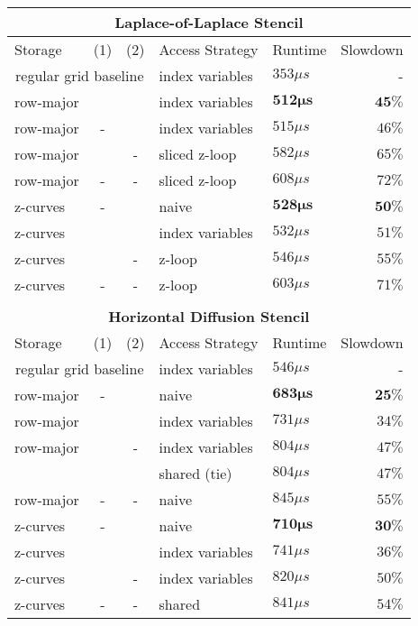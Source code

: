 \begin{table}
	\begin{tabular}{l c c l l r}		
		\multicolumn{6}{c}{\textbf{Laplace-of-Laplace Stencil}} \\
		\hline
		\hline
		Storage & (1) & (2) & Access Strategy  & Runtime & Slowdown \\
		\hline 
		\multicolumn{3}{c}{regular grid baseline} & index variables & $353 \mu s$ & -\\
		\hline
		 row-major & \checkmark & \checkmark & index variables &  $\mathbf{512 \mu s}$ & $\mathbf{45 \%}$ \\
		 row-major & - & \checkmark & index variables & $515 \mu s$ & $46 \%$ \\
		 row-major & \checkmark & - & sliced z-loop & $582 \mu s$ & $65\%$ \\
		 row-major & - & - & sliced z-loop & $608 \mu s$ & $72 \%$ \\
		\hline
		 z-curves & - & \checkmark & naive & $\mathbf{528 \mu s}$ & $\mathbf{50 \%}$ \\
		 z-curves & \checkmark & \checkmark & index variables & $532 \mu s$ & $51 \%$ \\
		 z-curves & \checkmark & - &  z-loop & $546\mu s$ & $55 \%$ \\
		 z-curves & - & - & z-loop & $603 \mu s$ & $71 \%$ \\
		
		\hline
		\hline \\
		\multicolumn{6}{c}{\textbf{Horizontal Diffusion Stencil}} \\
		\hline
		\hline
		Storage & (1) & (2) & Access Strategy  & Runtime & Slowdown \\
		\hline
		\multicolumn{3}{c}{regular grid baseline} & index variables & $546 \mu s$ & - \\
		\hline
 		 row-major & - & \checkmark & naive & $\mathbf{683 \mu s}$ & $\mathbf{25 \%}$ \\
		
		 row-major & \checkmark & \checkmark & index variables & $731 \mu s$ & $34 \%$ \\
		
		 row-major & \checkmark & - & index variables & $804\mu s$ & $47\%$ \\
		 &   & &  shared (tie) & $804\mu s$ & $47\%$ \\
		 row-major & - & - & naive & $845 \mu s$ & $55 \%$ \\
		\hline
		 z-curves & - & \checkmark & naive & $\mathbf{710 \mu s}$ & $\mathbf{30 \%}$ \\
		 z-curves & \checkmark & \checkmark & index variables & $741 \mu s$ & $36 \%$ \\
		 z-curves & \checkmark & - & index variables & $820\mu s$ &  $50 \%$ \\
		 z-curves & - & - & shared & $841 \mu s$ & $54 \%$ \\
		

\end{tabular}
\end{table}
